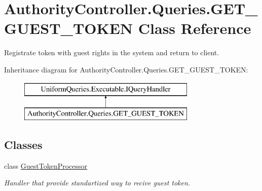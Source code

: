 \hypertarget{class_authority_controller_1_1_queries_1_1_g_e_t___g_u_e_s_t___t_o_k_e_n}{}\section{Authority\+Controller.\+Queries.\+G\+E\+T\+\_\+\+G\+U\+E\+S\+T\+\_\+\+T\+O\+K\+EN Class Reference}
\label{class_authority_controller_1_1_queries_1_1_g_e_t___g_u_e_s_t___t_o_k_e_n}


Registrate token with guest rights in the system and return to client.  


Inheritance diagram for Authority\+Controller.\+Queries.\+G\+E\+T\+\_\+\+G\+U\+E\+S\+T\+\_\+\+T\+O\+K\+EN\+:\begin{figure}[H]
\begin{center}
\leavevmode
\includegraphics[height=2.000000cm]{d0/db0/class_authority_controller_1_1_queries_1_1_g_e_t___g_u_e_s_t___t_o_k_e_n}
\end{center}
\end{figure}
\subsection*{Classes}
\begin{DoxyCompactItemize}
\item 
class \mbox{\hyperlink{class_authority_controller_1_1_queries_1_1_g_e_t___g_u_e_s_t___t_o_k_e_n_1_1_guest_token_processor}{Guest\+Token\+Processor}}
\begin{DoxyCompactList}\small\item\em Handler that provide standartized way to recive guest token. \end{DoxyCompactList}\end{DoxyCompactItemize}
